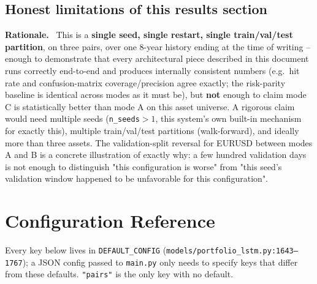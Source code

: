 \documentclass[11pt]{article}
\newcommand{\code}[1]{\texttt{\small #1}}
\newcommand{\rationalelabel}{\small\textbf{Rationale.}~}
\begin{document}
\subsection{Honest limitations of this results section}

\begin{rationale}\rationalelabel
This is a \textbf{single seed, single restart, single train/val/test partition}, on three
pairs, over one 8-year history ending at the time of writing -- enough to demonstrate that
every architectural piece described in this document runs correctly end-to-end and produces
internally consistent numbers (e.g.\ hit rate and confusion-matrix coverage/precision agree
exactly; the risk-parity baseline is identical across modes as it must be), but
\textbf{not} enough to claim mode C is statistically better than mode A on this asset
universe. A rigorous claim would need multiple seeds (\code{n\_seeds}$>1$, this system's own
built-in mechanism for exactly this), multiple train/val/test partitions (walk-forward), and
ideally more than three assets. The validation-split reversal for EURUSD between modes A and
B is a concrete illustration of exactly why: a few hundred validation days is not enough to
distinguish "this configuration is worse" from "this seed's validation window happened to be
unfavorable for this configuration".
\end{rationale}

\newpage


\section{Configuration Reference}
\label{sec:config}

Every key below lives in \code{DEFAULT\_CONFIG} (\texttt{models/portfolio\_lstm.py:1643--1767});
a JSON config passed to \texttt{main.py} only needs to specify keys that differ from these
defaults. \code{"pairs"} is the only key with no default.
\end{document}
